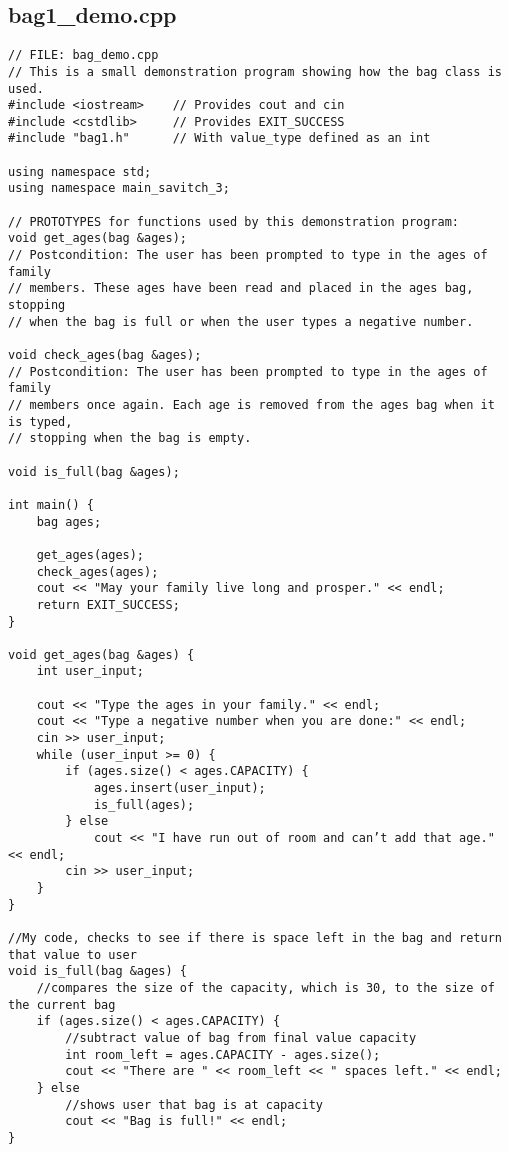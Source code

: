 \documentclass[11pt]{article}
\begin{document}
\subsection*{bag1\_demo.cpp}
\begin{lstlisting}
// FILE: bag_demo.cpp
// This is a small demonstration program showing how the bag class is used.
#include <iostream>    // Provides cout and cin
#include <cstdlib>     // Provides EXIT_SUCCESS
#include "bag1.h"      // With value_type defined as an int

using namespace std;
using namespace main_savitch_3;

// PROTOTYPES for functions used by this demonstration program:
void get_ages(bag &ages);
// Postcondition: The user has been prompted to type in the ages of family
// members. These ages have been read and placed in the ages bag, stopping
// when the bag is full or when the user types a negative number.

void check_ages(bag &ages);
// Postcondition: The user has been prompted to type in the ages of family
// members once again. Each age is removed from the ages bag when it is typed,
// stopping when the bag is empty.

void is_full(bag &ages);

int main() {
    bag ages;

    get_ages(ages);
    check_ages(ages);
    cout << "May your family live long and prosper." << endl;
    return EXIT_SUCCESS;
}

void get_ages(bag &ages) {
    int user_input;

    cout << "Type the ages in your family." << endl;
    cout << "Type a negative number when you are done:" << endl;
    cin >> user_input;
    while (user_input >= 0) {
        if (ages.size() < ages.CAPACITY) {
            ages.insert(user_input);
            is_full(ages);
        } else
            cout << "I have run out of room and can’t add that age." << endl;
        cin >> user_input;
    }
}

//My code, checks to see if there is space left in the bag and return that value to user
void is_full(bag &ages) {
    //compares the size of the capacity, which is 30, to the size of the current bag
    if (ages.size() < ages.CAPACITY) {
        //subtract value of bag from final value capacity
        int room_left = ages.CAPACITY - ages.size();
        cout << "There are " << room_left << " spaces left." << endl;
    } else
        //shows user that bag is at capacity
        cout << "Bag is full!" << endl;
}


\end{lstlisting}
\end{document}
